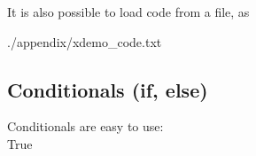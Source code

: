 It is also possible to load code from a file, as \\
\begin{minipage}[c]{0.8\textwidth}  %

	{./appendix/xdemo_code.txt} 
	\label{code:file}
\end{minipage}


\subsection{Conditionals (if, else)}
\newtoggle{myVariable} %
\togglefalse{myVariable}
\toggletrue{myVariable}

Conditionals are easy to use:\\
\iftoggle{myVariable}{ %
True
}{ %
False
} %

